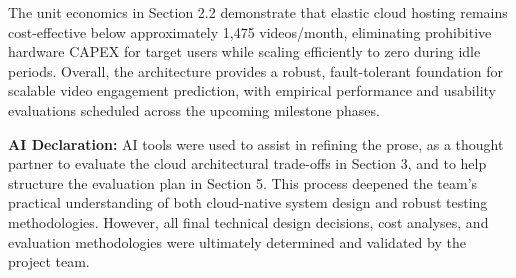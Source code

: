 \documentclass[10pt,a4paper]{article}
\begin{document}
The unit economics in Section 2.2 demonstrate that elastic cloud hosting remains cost-effective below approximately 1,475 videos/month, eliminating prohibitive hardware CAPEX for target users while scaling efficiently to zero during idle periods. Overall, the architecture provides a robust, fault-tolerant foundation for scalable video engagement prediction, with empirical performance and usability evaluations scheduled across the upcoming milestone phases.

\vspace{1mm}
\begin{tcolorbox}[colback=black!2, colframe=black!15, arc=3pt, boxrule=0.5pt, left=6pt, right=6pt, top=4pt, bottom=4pt]
{\footnotesize \textbf{AI Declaration:} AI tools were used to assist in refining the prose, as a thought partner to evaluate the cloud architectural trade-offs in Section 3, and to help structure the evaluation plan in Section 5. This process deepened the team's practical understanding of both cloud-native system design and robust testing methodologies. However, all final technical design decisions, cost analyses, and evaluation methodologies were ultimately determined and validated by the project team.}
\end{tcolorbox}
\end{document}
